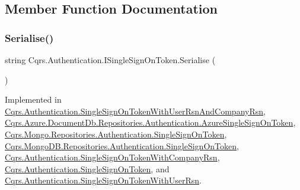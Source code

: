\subsection{Member Function Documentation}
\mbox{\label{interfaceCqrs_1_1Authentication_1_1ISingleSignOnToken_af34e8c0b052865d687064d3381bfbcdb_af34e8c0b052865d687064d3381bfbcdb}} 
\subsubsection{\texorpdfstring{Serialise()}{Serialise()}}
{\footnotesize\ttfamily string Cqrs.\+Authentication.\+I\+Single\+Sign\+On\+Token.\+Serialise (\begin{DoxyParamCaption}{ }\end{DoxyParamCaption})}



Implemented in \hyperlink{classCqrs_1_1Authentication_1_1SingleSignOnTokenWithUserRsnAndCompanyRsn_a8d44249c00e5264dc7b37f4868836a80_a8d44249c00e5264dc7b37f4868836a80}{Cqrs.\+Authentication.\+Single\+Sign\+On\+Token\+With\+User\+Rsn\+And\+Company\+Rsn}, \hyperlink{classCqrs_1_1Azure_1_1DocumentDb_1_1Repositories_1_1Authentication_1_1AzureSingleSignOnToken_a55c07b93600e6863985b50d4df346af0_a55c07b93600e6863985b50d4df346af0}{Cqrs.\+Azure.\+Document\+Db.\+Repositories.\+Authentication.\+Azure\+Single\+Sign\+On\+Token}, \hyperlink{classCqrs_1_1Mongo_1_1Repositories_1_1Authentication_1_1SingleSignOnToken_ab0ad6b0a6065a2553a093214e5a033b5_ab0ad6b0a6065a2553a093214e5a033b5}{Cqrs.\+Mongo.\+Repositories.\+Authentication.\+Single\+Sign\+On\+Token}, \hyperlink{classCqrs_1_1MongoDB_1_1Repositories_1_1Authentication_1_1SingleSignOnToken_a2392ecdb53f1f2a38a67d80a77f11ba4_a2392ecdb53f1f2a38a67d80a77f11ba4}{Cqrs.\+Mongo\+D\+B.\+Repositories.\+Authentication.\+Single\+Sign\+On\+Token}, \hyperlink{classCqrs_1_1Authentication_1_1SingleSignOnTokenWithCompanyRsn_a0bc9f0fae90121d029fe0730708f4210_a0bc9f0fae90121d029fe0730708f4210}{Cqrs.\+Authentication.\+Single\+Sign\+On\+Token\+With\+Company\+Rsn}, \hyperlink{classCqrs_1_1Authentication_1_1SingleSignOnToken_a5e859c6c5db5aaa9ef4e8f2086df4604_a5e859c6c5db5aaa9ef4e8f2086df4604}{Cqrs.\+Authentication.\+Single\+Sign\+On\+Token}, and \hyperlink{classCqrs_1_1Authentication_1_1SingleSignOnTokenWithUserRsn_a8103820e6352c10b3990fb027dd9b5ae_a8103820e6352c10b3990fb027dd9b5ae}{Cqrs.\+Authentication.\+Single\+Sign\+On\+Token\+With\+User\+Rsn}.



